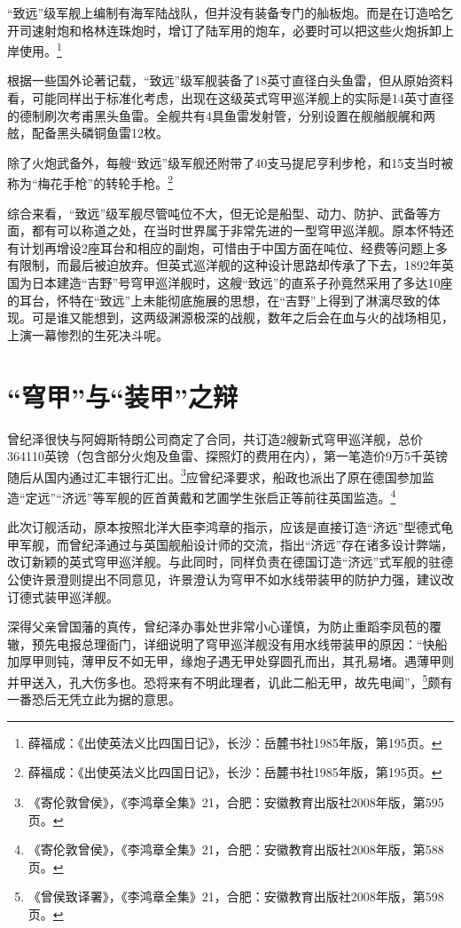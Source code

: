 \documentclass[12pt,UTF8]{ctexbook}
\begin{document}
“致远”级军舰上编制有海军陆战队，但并没有装备专门的舢板炮。而是在订造哈乞开司速射炮和格林连珠炮时，增订了陆军用的炮车，必要时可以把这些火炮拆卸上岸使用。\footnote{薛福成：《出使英法义比四国日记》，长沙：岳麓书社1985年版，第195页。}

根据一些国外论著记载，“致远”级军舰装备了18英寸直径白头鱼雷，但从原始资料看，可能同样出于标准化考虑，出现在这级英式穹甲巡洋舰上的实际是14英寸直径的德制刷次考甫黑头鱼雷。全舰共有4具鱼雷发射管，分别设置在舰艏舰艉和两舷，配备黑头磷铜鱼雷12枚。

除了火炮武备外，每艘“致远”级军舰还附带了40支马提尼亨利步枪，和15支当时被称为“梅花手枪”的转轮手枪。\footnote{薛福成：《出使英法义比四国日记》，长沙：岳麓书社1985年版，第195页。}

综合来看，“致远”级军舰尽管吨位不大，但无论是船型、动力、防护、武备等方面，都有可以称道之处，在当时世界属于非常先进的一型穹甲巡洋舰。原本怀特还有计划再增设2座耳台和相应的副炮，可惜由于中国方面在吨位、经费等问题上多有限制，而最后被迫放弃。但英式巡洋舰的这种设计思路却传承了下去，1892年英国为日本建造“吉野”号穹甲巡洋舰时，这艘“致远”的直系子孙竟然采用了多达10座的耳台，怀特在“致远”上未能彻底施展的思想，在“吉野”上得到了淋漓尽致的体现。可是谁又能想到，这两级渊源极深的战舰，数年之后会在血与火的战场相见，上演一幕惨烈的生死决斗呢。

\section{“穹甲”与“装甲”之辩}

曾纪泽很快与阿姆斯特朗公司商定了合同，共订造2艘新式穹甲巡洋舰，总价364110英镑（包含部分火炮及鱼雷、探照灯的费用在内），第一笔造价9万5千英镑随后从国内通过汇丰银行汇出。\footnote{《寄伦敦曾侯》，《李鸿章全集》21，合肥：安徽教育出版社2008年版，第595页。}应曾纪泽要求，船政也派出了原在德国参加监造“定远”“济远”等军舰的匠首黄戴和艺圃学生张启正等前往英国监造。\footnote{《寄伦敦曾侯》，《李鸿章全集》21，合肥：安徽教育出版社2008年版，第588页。}

此次订舰活动，原本按照北洋大臣李鸿章的指示，应该是直接订造“济远”型德式龟甲军舰，而曾纪泽通过与英国舰船设计师的交流，指出“济远”存在诸多设计弊端，改订新颖的英式穹甲巡洋舰。与此同时，同样负责在德国订造“济远”式军舰的驻德公使许景澄则提出不同意见，许景澄认为穹甲不如水线带装甲的防护力强，建议改订德式装甲巡洋舰。

深得父亲曾国藩的真传，曾纪泽办事处世非常小心谨慎，为防止重蹈李凤苞的覆辙，预先电报总理衙门，详细说明了穹甲巡洋舰没有用水线带装甲的原因：“快船加厚甲则钝，薄甲反不如无甲，缘炮子遇无甲处穿圆孔而出，其孔易堵。遇薄甲则并甲送入，孔大伤多也。恐将来有不明此理者，讥此二船无甲，故先电闻”，\footnote{《曾侯致译署》，《李鸿章全集》21，合肥：安徽教育出版社2008年版，第598页。}颇有一番恐后无凭立此为据的意思。
\end{document}
